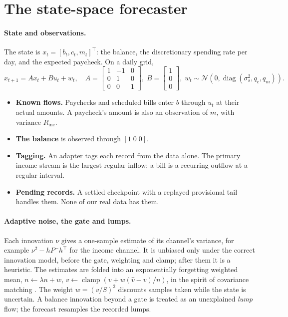 \section{The state-space forecaster}
\label{sec:method}

\paragraph{State and observations.} The state is
$x_t = [b_t, c_t, m_t]^\top$: the balance, the discretionary spending rate
per day, and the expected paycheck. On a daily grid,
\begin{equation}
x_{t+1} = A x_t + B u_t + w_t,\quad
A = \begin{bmatrix}1&-1&0\\0&1&0\\0&0&1\end{bmatrix},\;
B = \begin{bmatrix}1\\0\\0\end{bmatrix},\;
w_t \sim \mathcal N\!\left(0, \operatorname{diag}(\sigma_s^2, q_c, q_m)\right).
\end{equation}
\begin{itemize}
\item \textbf{Known flows.} Paychecks and scheduled bills enter $b$
  through $u_t$ at their actual amounts. A paycheck's amount is also an
  observation of $m$, with variance $R_{\text{inc}}$.
\item \textbf{The balance} is observed through $[1\;0\;0]$.
\item \textbf{Tagging.} An adapter tags each record from the data alone.
  The primary income stream is the largest regular inflow; a bill is a
  recurring outflow at a regular interval.
\item \textbf{Pending records.} A settled checkpoint with a replayed
  provisional tail handles them. None of our real data has them.
\end{itemize}

\paragraph{Adaptive noise, the gate and lumps.} Each innovation $\nu$ gives
a one-sample estimate of its channel's variance, for example
$\nu^2 - hP^-h^\top$ for the income channel. It is unbiased only under the
correct innovation model, before the gate, weighting and clamp; after them
it is a heuristic. The estimates are folded into an exponentially
forgetting weighted mean, $n \leftarrow \lambda n + w$,
$v \leftarrow \operatorname{clamp}(v + w(\hat v - v)/n)$, in the spirit of
covariance matching \citep{mehra1970,myers1976}. The weight $w = (v/S)^2$
discounts samples taken while the state is uncertain. A balance innovation
beyond a gate is treated as an unexplained \emph{lump} flow; the forecast
resamples the recorded lumps.

